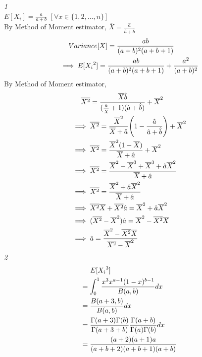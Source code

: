 \documentclass[12pt,letterpaper,fleqn]{article}
\begin{document}
\textit{1}\\
$E[X_i] = \frac{a}{a+b}$ \hfill $[\forall x \in \{1, 2, \ldots, n\}]$\\
By Method of Moment estimator,
$\overline{X} = \frac{\hat{a}}{\hat{a}+\hat{b}}$
\begin{equation}
  \begin{split}
    &\hspace{1.4em}Variance[X] = \frac{ab}{(a+b)^2(a+b+1)}\\
    &\implies E[{X_i}^2] = \frac{ab}{(a+b)^2(a+b+1)} + \frac{a^2}{(a+b)^2}
  \end{split}
\end{equation}
By Method of Moment estimator,
\begin{equation}
  \begin{split}
    &\hspace{1.4em}\overline{X^2} = \frac{\overline{X}\hat{b}}{(\frac{\hat{a}}{\overline{X}}+1)(\hat{a}+\hat{b})} + \overline{X}^2\\
    &\implies \overline{X^2} = \frac{\overline{X}^2}{\overline{X}+\hat{a}}\Biggl(1-\frac{\hat{a}}{\hat{a}+\hat{b}}\Biggr) + \overline{X}^2\\
    &\implies \overline{X^2} = \frac{\overline{X}^2(1-\overline{X})}{\overline{X}+\hat{a}} + \overline{X}^2\\
    &\implies \overline{X^2} = \frac{\overline{X}^2 - \overline{X}^3 + \overline{X}^3 + \hat{a}\overline{X}^2}{\overline{X}+\hat{a}}\\
    &\implies \overline{X^2} = \frac{\overline{X}^2 + \hat{a}\overline{X}^2}{\overline{X}+\hat{a}}\\
    &\implies \overline{X^2}\overline{X} + \overline{X^2}\hat{a} = \overline{X}^2 + \hat{a}\overline{X}^2\\
    &\implies (\overline{X^2} - \overline{X}^2)\hat{a} = \overline{X}^2 - \overline{X^2}\overline{X}\\
    &\implies \hat{a} = \frac{\overline{X}^2 - \overline{X^2}\overline{X}}{\overline{X^2} - \overline{X}^2}\\
  \end{split}
\end{equation}
\newpage
\textit{2}\\
\begin{equation}
  \begin{split}
    &\hspace{1.4em}E[{X_i}^3]\\
    &= \int_0^1 \frac{x^3 x^{a-1} (1-x)^{b-1}}{B(a, b)}dx\\
    &= \frac{B(a+3, b)}{B(a, b)}dx\\
    &= \frac{\Gamma(a+3)\Gamma(b)}{\Gamma(a+3+b)} \frac{\Gamma(a+b)}{\Gamma(a)\Gamma(b)}dx\\
    &= \frac{(a+2)(a+1)a}{(a+b+2)(a+b+1)(a+b)}
  \end{split}
\end{equation}
\end{document}
